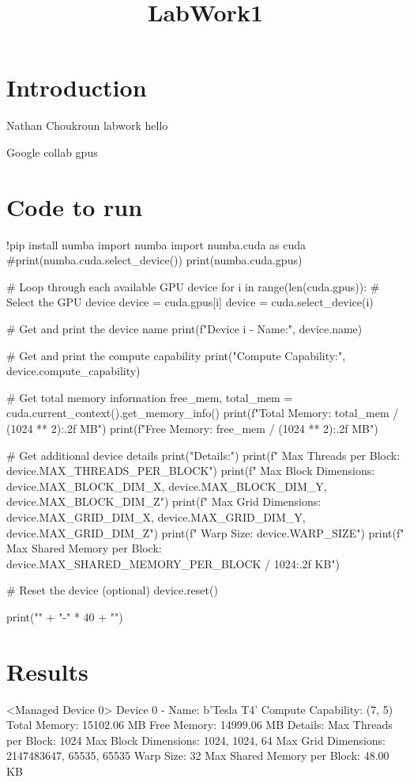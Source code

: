 \documentclass{article}
\begin{document}
\title{LabWork1}
\section{Introduction}

Nathan Choukroun labwork hello

Google collab gpus

\section{Code to run}

!pip install numba
import numba
import numba.cuda as cuda
#print(numba.cuda.select_device())
print(numba.cuda.gpus)

# Loop through each available GPU device
for i in range(len(cuda.gpus)):
  # Select the GPU device
  device = cuda.gpus[i]
  device = cuda.select_device(i)

  # Get and print the device name
  print(f"Device {i} - Name:", device.name)

  # Get and print the compute capability
  print("Compute Capability:", device.compute_capability)

  # Get total memory information
  free_mem, total_mem = cuda.current_context().get_memory_info()
  print(f"Total Memory: {total_mem / (1024 ** 2):.2f} MB")
  print(f"Free Memory: {free_mem / (1024 ** 2):.2f} MB")
  
  # Get additional device details
  print("Details:")
  print(f"  Max Threads per Block: {device.MAX_THREADS_PER_BLOCK}")
  print(f"  Max Block Dimensions: {device.MAX_BLOCK_DIM_X}, {device.MAX_BLOCK_DIM_Y}, {device.MAX_BLOCK_DIM_Z}")
  print(f"  Max Grid Dimensions: {device.MAX_GRID_DIM_X}, {device.MAX_GRID_DIM_Y}, {device.MAX_GRID_DIM_Z}")
  print(f"  Warp Size: {device.WARP_SIZE}")
  print(f"  Max Shared Memory per Block: {device.MAX_SHARED_MEMORY_PER_BLOCK / 1024:.2f} KB")
  
  # Reset the device (optional)
  device.reset()

  print("\n" + "-" * 40 + "\n")

\section{Results}

<Managed Device 0>
Device 0 - Name: b'Tesla T4'
Compute Capability: (7, 5)
Total Memory: 15102.06 MB
Free Memory: 14999.06 MB
Details:
  Max Threads per Block: 1024
  Max Block Dimensions: 1024, 1024, 64
  Max Grid Dimensions: 2147483647, 65535, 65535
  Warp Size: 32
  Max Shared Memory per Block: 48.00 KB
\end{document}
